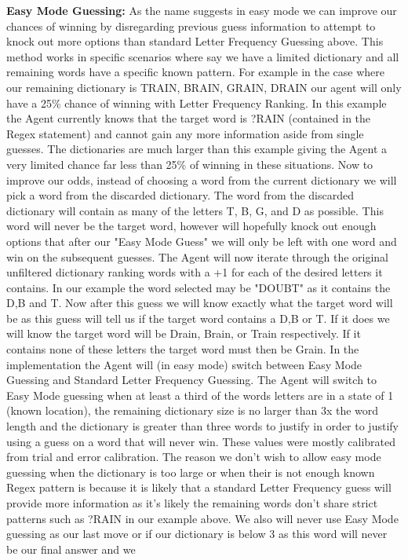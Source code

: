 \documentclass[12pt]{article}
\begin{document}
\item \textbf{Easy Mode Guessing:} As the name suggests in easy mode we can improve our chances of winning by disregarding previous guess information to attempt to knock out more options than standard Letter Frequency Guessing above. This method works in specific scenarios where say we have a limited dictionary and all remaining words have a specific known pattern. For example in the case where our remaining dictionary is TRAIN, BRAIN, GRAIN, DRAIN our agent will only have a 25\% chance of winning with Letter Frequency Ranking. In this example the Agent currently knows that the target word is ?RAIN (contained in the Regex statement) and cannot gain any more information aside from single guesses. The dictionaries are much larger than this example giving the Agent a very limited chance far less than 25\% of winning in these situations. Now to improve our odds, instead of choosing a word from the current dictionary we will pick a word from the discarded dictionary. The word from the discarded dictionary will contain as many of the letters T, B, G, and D as possible. This word will never be the target word, however will hopefully knock out enough options that after our "Easy Mode Guess" we will only be left with one word and win on the subsequent guesses. The Agent will now iterate through the original unfiltered dictionary ranking words with a +1 for each of the desired letters it contains. In our example the word selected may be "DOUBT" as it contains the D,B and T. Now after this guess we will know exactly what the target word will be as this guess will tell us if the target word contains a D,B or T. If it does we will know the target word will be Drain, Brain, or Train respectively. If it contains none of these letters the target word must then be Grain. In the implementation the Agent will (in easy mode) switch between Easy Mode Guessing and Standard Letter Frequency Guessing. The Agent will switch to Easy Mode guessing when at least a third of the words letters are in a state of 1 (known location), the remaining dictionary size is no larger than 3x the word length and the dictionary is greater than three words to justify in order to justify using a guess on a word that will never win. These values were mostly calibrated from trial and error calibration. The reason we don't wish to allow easy mode guessing when the dictionary is too large or when their is not enough known Regex pattern is because it is likely that a standard Letter Frequency guess will provide more information as it's likely the remaining words don't share strict patterns such as ?RAIN in our example above. We also will never use Easy Mode guessing as our last move or if our dictionary is below 3 as this word will never be our final answer and we
\end{document}
